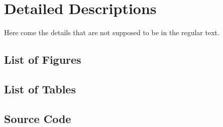 \chapter{Detailed Descriptions}
\label{chapter:DetailedDescriptions}
Here come the details that are not supposed to be in the regular text.

\section{List of Figures}
\begingroup
\let\oldclearpage\clearpage
\let\clearpage\relax
\listoffigures
\let\clearpage\oldclearpage
\endgroup
\newpage

\section{List of Tables}
\begingroup
\let\oldclearpage\clearpage
\let\clearpage\relax
\listoffigures
\let\clearpage\oldclearpage
\endgroup

\section{Source Code}

